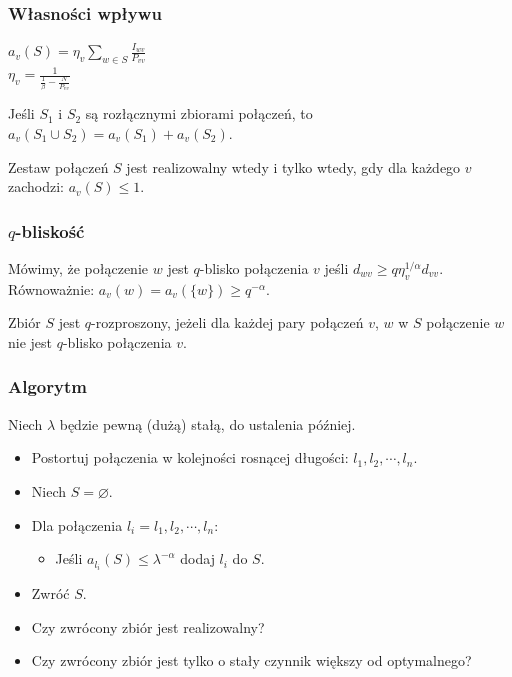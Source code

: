 \documentclass[polish, t,10pt]{beamer}
\begin{document}
\begin{frame}
    \frametitle{Własności wpływu}
    \begin{definition}
        $a_v(S) = \eta_v \sum_{w \in S} \frac{I_{wv}}{P_{vv}}$\\
        $\eta_v = \frac{1}{\frac{1}{\beta} - \frac{N}{P_{vv}}}$
    \end{definition}
    \begin{lemma}
        Jeśli $S_1$ i $S_2$ są rozłącznymi zbiorami połączeń, to $a_v(S_1 \cup S_2) = a_v(S_1) + a_v(S_2)$.
    \end{lemma}
    \begin{lemma}
        Zestaw połączeń $S$ jest realizowalny wtedy i tylko wtedy, gdy dla każdego $v$ zachodzi:
        $a_v(S) \le 1$.
    \end{lemma}
\end{frame}

\begin{frame}
    \frametitle{$q$-bliskość}
    \begin{definition}
        Mówimy, że połączenie $w$ jest $q$-blisko połączenia $v$ jeśli $d_{wv} \ge q \eta_v^{1/\alpha} d_{vv}$.
        Równoważnie: $a_v(w) = a_v(\{w\}) \ge q^{-\alpha}$.
    \end{definition}

    \begin{definition}
        Zbiór $S$ jest $q$-rozproszony, jeżeli dla każdej pary połączeń $v$, $w$ w $S$ połączenie $w$ nie jest $q$-blisko połączenia $v$.
    \end{definition}
\end{frame}

\begin{frame}
    \frametitle{Algorytm}
    Niech $\lambda$ będzie pewną (dużą) stałą, do ustalenia później.
    \begin{itemize}
        \item Postortuj połączenia w kolejności rosnącej długości: $l_1, l_2, \cdots, l_n$.
        \item Niech $S = \varnothing$.
        \item Dla połączenia $l_i = l_1, l_2, \cdots, l_n$:
        \begin{itemize}
            \item Jeśli $a_{l_i}(S) \le \lambda^{-\alpha}$ dodaj $l_i$ do $S$.
        \end{itemize}
        \item Zwróć $S$.
    \end{itemize}
    \pause
    \vfill
    \begin{itemize}
        \item Czy zwrócony zbiór jest realizowalny?
        \pause
        \item Czy zwrócony zbiór jest tylko o stały czynnik większy od optymalnego?
    \end{itemize}
\end{frame}
\end{document}
